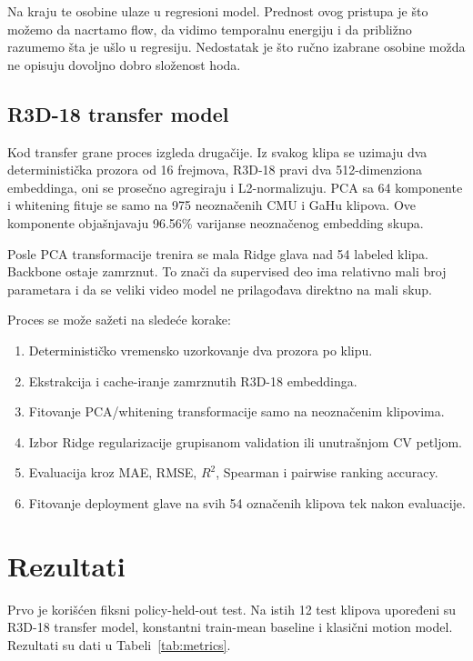 ﻿\documentclass[12pt,a4paper]{report}
\begin{document}
Na kraju te osobine ulaze u regresioni model. Prednost ovog pristupa je što
možemo da nacrtamo flow, da vidimo temporalnu energiju i da približno razumemo
šta je ušlo u regresiju. Nedostatak je što ručno izabrane osobine možda ne
opisuju dovoljno dobro složenost hoda.

\subsection{R3D-18 transfer model}

Kod transfer grane proces izgleda drugačije. Iz svakog klipa se uzimaju dva
deterministička prozora od 16 frejmova, R3D-18 pravi dva 512-dimenziona
embeddinga, oni se prosečno agregiraju i L2-normalizuju. PCA sa 64 komponente i
whitening fituje se samo na 975 neoznačenih CMU i GaHu klipova. Ove komponente
objašnjavaju 96.56\% varijanse neoznačenog embedding skupa.

Posle PCA transformacije trenira se mala Ridge glava nad 54 labeled klipa.
Backbone ostaje zamrznut. To znači da supervised deo ima relativno mali broj
parametara i da se veliki video model ne prilagođava direktno na mali skup.

Proces se može sažeti na sledeće korake:
\begin{enumerate}[leftmargin=1.4cm]
  \item Determinističko vremensko uzorkovanje dva prozora po klipu.
  \item Ekstrakcija i cache-iranje zamrznutih R3D-18 embeddinga.
  \item Fitovanje PCA/whitening transformacije samo na neoznačenim klipovima.
  \item Izbor Ridge regularizacije grupisanom validation ili unutrašnjom CV petljom.
  \item Evaluacija kroz MAE, RMSE, $R^2$, Spearman i pairwise ranking accuracy.
  \item Fitovanje deployment glave na svih 54 označenih klipova tek nakon evaluacije.
\end{enumerate}

\section{Rezultati}

Prvo je korišćen fiksni policy-held-out test. Na istih 12 test klipova
upoređeni su R3D-18 transfer model, konstantni train-mean baseline i klasični
motion model. Rezultati su dati u Tabeli~\ref{tab:metrics}.
\end{document}
